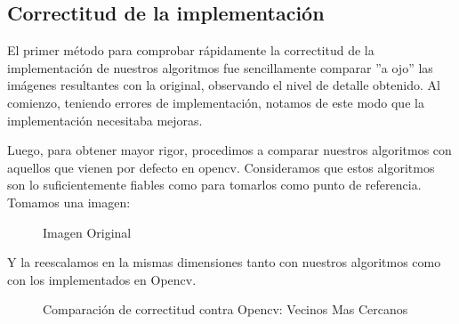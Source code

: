 \subsection{Correctitud de la implementación}

El primer método para comprobar rápidamente la correctitud de la implementación de nuestros algoritmos fue sencillamente comparar ''a ojo'' las imágenes resultantes con la original, observando el nivel de detalle obtenido. Al comienzo, teniendo errores de implementación, notamos de este modo que la implementación necesitaba mejoras.

Luego, para obtener mayor rigor, procedimos a comparar nuestros algoritmos con aquellos que vienen por defecto en opencv. Consideramos que estos algoritmos son lo suficientemente fiables como para tomarlos como punto de referencia. Tomamos una imagen:
\begin{figure}[H]
    \centering
{}
\caption{Imagen Original}
\end{figure}
Y la reescalamos en la mismas dimensiones tanto con nuestros algoritmos como con los implementados en Opencv.

\begin{figure}[H]
    \centering
    \qquad
    \caption{Comparación de correctitud contra Opencv: Vecinos Mas Cercanos}
\end{figure}

